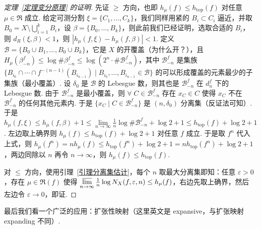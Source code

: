 \documentclass[11pt, a4paper, oneside]{ctexart}
\newcommand{\cB}{\mathcal{B}}
\newcommand{\fR}{\mathfrak{R}}
\renewcommand{\top}{\mathrm{top}}
\newcommand{\abs}[1]{\left|{#1}\right|}
\begin{document}
    \begin{proof}[定理~\ref{定理变分原理} 的证明]
        先证 $\geq$ 方向，也即 $h_{\mu}(f)\leq h_{\top}(f)$ 对任意 $\mu\in\fR$ 成立. 给定可测分割 $\xi=\{C_1,\ldots,C_k\}$，我们同样用紧的 $B_i\subset C_i$ 逼近，并取 $B_0=X\setminus\bigcup\limits_{i=1}^{k}B_i$，设 $\beta=\{B_0,\ldots,B_k\}$，则此前我们已经证明，选取合适的 $B_i$，则 $d_R(\xi,\beta)<1$，则 $\abs{h_{\mu}(f,\xi)-h_{\mu}(f,\beta)}<1$. 定义 $\cB=\{B_0\cup B_1,\ldots,B_0\cup B_k\}$，它是 $X$ 的开覆盖（为什么开？），且 $H_{\mu}(\beta_{-n}^f)\leq \log\# \beta_{-n}^f\leq \log(2^n\cdot\#\cB_{-n}^f)$，其中 $\cB_{-n}^f$ 是集族 $\{B_{i_0}\cap\cdots\cap f^{-(n-1)}(B_{i_{n-1}})\mid B_{i_0},\ldots,B_{i_{n-1}}\in\cB\}$ 的可以形成覆盖的元素最少的子集族（最小覆盖）. 设 $\delta_0$ 是 $\cB$ 的 Lebesgue 数，则其也是 $\cB_{-n}^f$ 在 $d_n^f$ 下的 Lebesgue 数. 由于 $\cB_{-n}^f$ 是最小覆盖，则 $\forall\; C\in \cB_{-n}^f$ 存在 $x_C\in C$ 使得 $x_C$ 不在 $\cB_{-n}^f$ 的任何其他元素内. 于是 $\{x_C\mid C\in\cB_{-n}^f\}$ 是 $(n,\delta_0)$ 分离集（反证法可知）. 于是 $h_{\mu}(f,\xi)\leq h_{\mu}(f,\beta)+1\leq \lim\limits_{n\to\infty}\frac{1}{n}\log\#\cB_{-n}^f+\log 2+1\leq h_{\top}(f)+\log 2+1$. 左边取上确界则 $h_{\mu}(f)\leq h_{\top}(f)+\log 2+1$ 对任意 $f$ 成立. 于是取 $f^n$ 代入上式，则 $h_{\mu}(f^n)=nh_{\mu}(f)\leq h_{\top}(f^n)+\log 2+1=nh_{\top}(f^n)+\log 2+1$，两边同除以 $n$ 再令 $n\to\infty$，则 $h_{\mu}(f)\leq h_{\top}(f)$.

        对 $\leq$ 方向，使用引理~\ref{引理分离集估计}，每个 $n$ 取最大分离集即知：任意 $\varepsilon>0$，存在 $\mu\in\fR(f)$ 使得 $\varlimsup\limits_{n\to\infty}\frac{1}{n}\log N_X(f,\varepsilon,n)\leq h_{\mu}(f)$，右边先取上确界，然后左边令 $\varepsilon\to 0$，即证.
    \end{proof}

    最后我们看一个广泛的应用：扩张性映射（这里英文是 expansive，与扩张映射 expanding 不同）.
\end{document}

